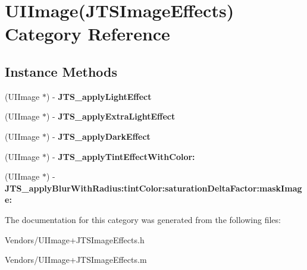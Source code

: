 \hypertarget{category_u_i_image_07_j_t_s_image_effects_08}{}\section{U\+I\+Image(J\+T\+S\+Image\+Effects) Category Reference}
\label{category_u_i_image_07_j_t_s_image_effects_08}
\subsection*{Instance Methods}
\begin{DoxyCompactItemize}
\item 
\hypertarget{category_u_i_image_07_j_t_s_image_effects_08_a2b353397a852ce8c0999e4ebaf96259a}{}(U\+I\+Image $\ast$) -\/ {\bfseries J\+T\+S\+\_\+apply\+Light\+Effect}\label{category_u_i_image_07_j_t_s_image_effects_08_a2b353397a852ce8c0999e4ebaf96259a}

\item 
\hypertarget{category_u_i_image_07_j_t_s_image_effects_08_a13d772644fd5e6e004831b68fa27f4e0}{}(U\+I\+Image $\ast$) -\/ {\bfseries J\+T\+S\+\_\+apply\+Extra\+Light\+Effect}\label{category_u_i_image_07_j_t_s_image_effects_08_a13d772644fd5e6e004831b68fa27f4e0}

\item 
\hypertarget{category_u_i_image_07_j_t_s_image_effects_08_a25234981b839660e4462edd0a63c4468}{}(U\+I\+Image $\ast$) -\/ {\bfseries J\+T\+S\+\_\+apply\+Dark\+Effect}\label{category_u_i_image_07_j_t_s_image_effects_08_a25234981b839660e4462edd0a63c4468}

\item 
\hypertarget{category_u_i_image_07_j_t_s_image_effects_08_ab63d37df329a838b9bf2f9c0073bf237}{}(U\+I\+Image $\ast$) -\/ {\bfseries J\+T\+S\+\_\+apply\+Tint\+Effect\+With\+Color\+:}\label{category_u_i_image_07_j_t_s_image_effects_08_ab63d37df329a838b9bf2f9c0073bf237}

\item 
\hypertarget{category_u_i_image_07_j_t_s_image_effects_08_a336965a89fd443196379087b8341a78e}{}(U\+I\+Image $\ast$) -\/ {\bfseries J\+T\+S\+\_\+apply\+Blur\+With\+Radius\+:tint\+Color\+:saturation\+Delta\+Factor\+:mask\+Image\+:}\label{category_u_i_image_07_j_t_s_image_effects_08_a336965a89fd443196379087b8341a78e}

\end{DoxyCompactItemize}


The documentation for this category was generated from the following files\+:\begin{DoxyCompactItemize}
\item 
Vendors/U\+I\+Image+\+J\+T\+S\+Image\+Effects.\+h\item 
Vendors/U\+I\+Image+\+J\+T\+S\+Image\+Effects.\+m\end{DoxyCompactItemize}

